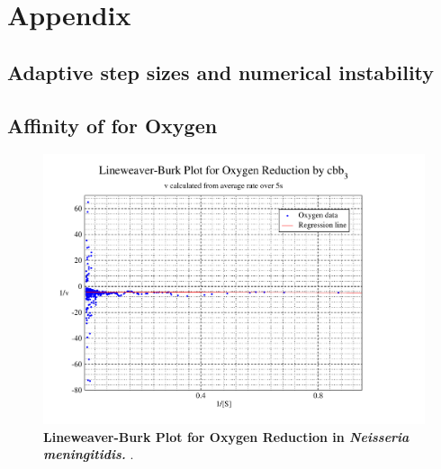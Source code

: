\appendix
\chapter{Appendix}
\section{Adaptive step sizes and numerical instability}

\section{Affinity of \cbbthree{} for Oxygen}
\begin{figure}[h]
 \centering
 \includegraphics[width=14cm, trim=2cm 1cm 4cm 1cm]{./appendix/data/lbplot.pdf}
 \caption[{Lineweaver-Burk Plot for Oxygen Reduction in \textit{Neisseria meningitidis}.}]{{\bf Lineweaver-Burk Plot for Oxygen Reduction in \textit{Neisseria meningitidis.}} .
 \label{fig:o2lb}}
\end{figure}

